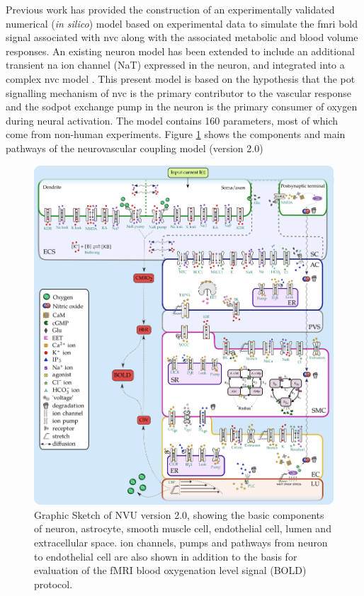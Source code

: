 Previous work \cite{Mathias2018} has provided  the construction of an experimentally validated numerical (\textit{in silico}) model based on experimental data to simulate the \gls{fmri} \gls{bold} signal associated with \gls{nvc} along with the associated metabolic and blood volume responses. An existing neuron model \citep{Mathias2017, Mathias2017a} has been extended to include an additional transient \gls{na} ion channel (NaT) expressed in the neuron, and integrated into a complex \gls{nvc} model \citep{Dormanns2015, Dormanns2016, Kenny2017a}. This present model is based on the hypothesis that the \gls{pot} signalling mechanism of \gls{nvc} is the primary contributor to the vascular response and the \gls{sodpot} exchange pump in the neuron is the primary consumer of oxygen during neural activation. The model contains 160 parameters, most of which come from non-human experiments. 
Figure \ref{fig:nvu20} shows the components and main pathways of the neurovascular coupling model (version 2.0) \\

\begin{figure}[h!]
\centering
\includegraphics[width=0.7\linewidth]{Figures/nvu_20}
\caption[Graphic Sketch of NVU version 2.0]{Graphic Sketch of NVU version 2.0, showing the basic components of neuron, astrocyte, smooth muscle cell, endothelial cell, lumen and extracellular space. ion channels, pumps and pathways from neuron to endothelial cell are also shown in addition to the basis for evaluation of the fMRI blood oxygenation level signal (BOLD) protocol.}
\label{fig:nvu20}
\end{figure}


